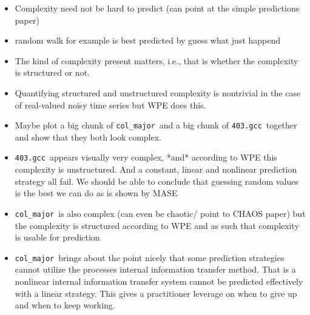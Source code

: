 \documentclass{article}
\newcommand{\gcc}{{\tt 403.gcc}~}
\newcommand{\col}{{\tt col\_major}~}
\begin{document}
\begin{itemize}
\item Complexity need not be hard to predict (can point at the simple predictions paper)
\item random walk for example is best predicted by guess what just happend
\item The kind of complexity present matters, i.e., that is whether the complexity is structured or not. 
\item Quantifying structured and unstructured complexity is nontrivial in the case of real-valued noisy time series but WPE does this.
\item Maybe plot a big chunk of \col and a big chunk of \gcc together and show that they both look complex. 

\item \gcc appears visually very complex, *and* according to WPE this complexity is unstructured. And a constant, linear and nonlinear prediction strategy all fail. We should be able to conclude that guessing random values is the best we can do as is shown by MASE

\item \col is also complex (can even be chaotic/ point to CHAOS paper) but the complexity is structured according to WPE and as such that complexity is usable for prediction

\item \col brings about the point nicely that some prediction strategies cannot utilize the processes internal information transfer method. That is a nonlinear internal information transfer system cannot be predicted effectively with a linear strategy. This gives a practitioner leverage on when to give up and when to keep working.

\end{itemize}
\end{document}
